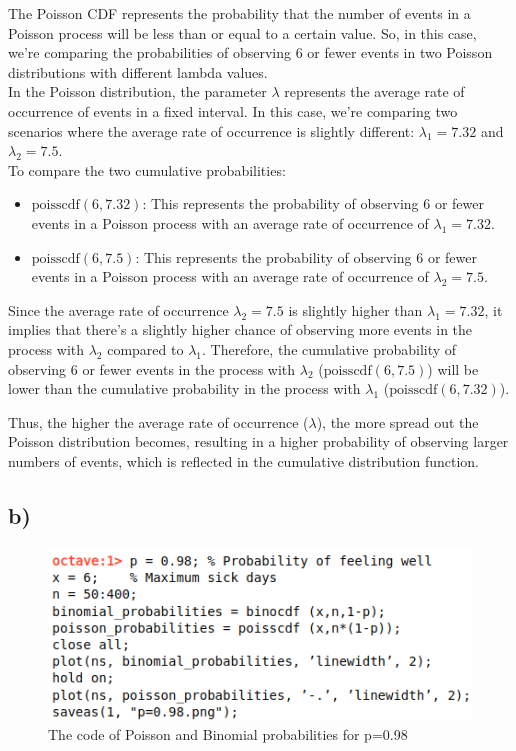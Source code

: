 \documentclass[12pt]{article}
\begin{document}
The Poisson CDF represents the probability that the number of events in a Poisson process will be less than or equal to a certain value. So, in this case, we're comparing the probabilities of observing 6 or fewer events in two Poisson distributions with different lambda values. \\

In the Poisson distribution, the parameter $\lambda$ represents the average rate of occurrence of events in a fixed interval. In this case, we're comparing two scenarios where the average rate of occurrence is slightly different: $\lambda_1 = 7.32$ and $\lambda_2 = 7.5$. \\

To compare the two cumulative probabilities:

\begin{itemize}
    \item $\text{poisscdf}(6, 7.32)$: This represents the probability of observing 6 or fewer events in a Poisson process with an average rate of occurrence of $\lambda_1 = 7.32$.

    \item $\text{poisscdf}(6, 7.5)$: This represents the probability of observing 6 or fewer events in a Poisson process with an average rate of occurrence of $\lambda_2 = 7.5$.
\end{itemize}

Since the average rate of occurrence $\lambda_2 = 7.5$ is slightly higher than $\lambda_1 = 7.32$, it implies that there's a slightly higher chance of observing more events in the process with $\lambda_2$ compared to $\lambda_1$. Therefore, the cumulative probability of observing 6 or fewer events in the process with $\lambda_2$ ($\text{poisscdf}(6, 7.5)$) will be lower than the cumulative probability in the process with $\lambda_1$ ($\text{poisscdf}(6, 7.32)$).

Thus, the higher the average rate of occurrence ($\lambda$), the more spread out the Poisson distribution becomes, resulting in a higher probability of observing larger numbers of events, which is reflected in the cumulative distribution function.


\subsection*{b)} 

\begin{figure}[H]
    \centering
    \includegraphics[scale=0.6]{3b_kod}
    \caption{The code of Poisson and Binomial probabilities for p=0.98}
\end{figure}
\end{document}
